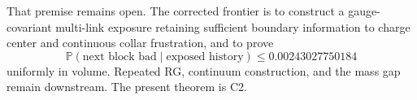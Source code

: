 \documentclass[11pt]{article}
\begin{document}
That premise remains open.  The corrected frontier is to construct a
gauge-covariant multi-link exposure retaining sufficient boundary information
to charge center and continuous collar frustration, and to prove
\[
 \mathbb P(\text{next block bad}\mid\text{exposed history})
 \leq0.00243027750184
\]
uniformly in volume.  Repeated RG, continuum construction, and the mass gap
remain downstream.  The present theorem is C2.
\end{document}
